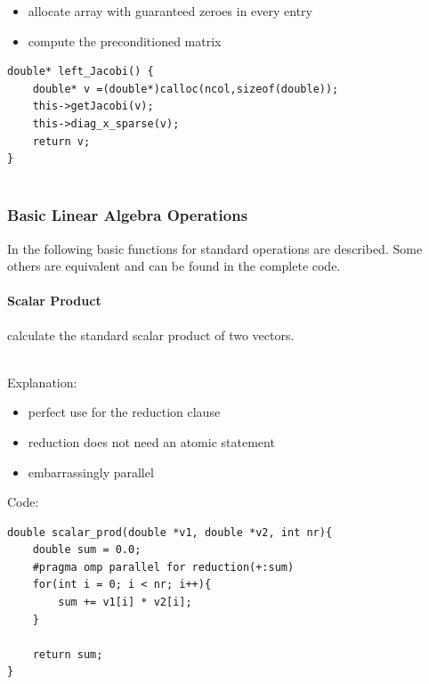 \documentclass{article}
\begin{document}
\begin{minipage}[t]{0.45\textwidth}
\begin{itemize}
    \item allocate array with guaranteed zeroes in every entry
    \item compute the preconditioned matrix
\end{itemize}
\end{minipage}
\hspace{0.7cm}
\begin{minipage}[t]{0.35\textwidth}
\begin{verbatim}
double* left_Jacobi() {
    double* v =(double*)calloc(ncol,sizeof(double));
    this->getJacobi(v);
    this->diag_x_sparse(v);
    return v;
}


\end{verbatim}
\end{minipage}




\subsubsection{Basic Linear Algebra Operations}
In the following basic functions for standard operations are described. Some others are equivalent and can be found in the complete code.
\paragraph{Scalar Product} calculate the standard scalar product of two vectors.\\\\
\begin{minipage}[t]{0.45\textwidth}
Explanation:
\begin{itemize}
    \item perfect use for the reduction clause
    \item reduction does not need an atomic statement
    \item embarrassingly parallel
\end{itemize}
\end{minipage}
\hspace{.7cm}
\begin{minipage}[t]{0.35\textwidth}
Code:
\begin{verbatim}
double scalar_prod(double *v1, double *v2, int nr){
    double sum = 0.0;
    #pragma omp parallel for reduction(+:sum)
    for(int i = 0; i < nr; i++){
        sum += v1[i] * v2[i];
    }
    
    return sum;
}
\end{verbatim}
\end{minipage}
\end{document}
